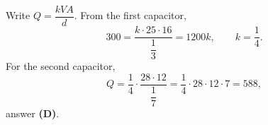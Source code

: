 Write $Q=\dfrac{kVA}{d}$. From the first capacitor,
\[
300=\dfrac{k\cdot25\cdot16}{\dfrac{1}{3}}=1200k,\qquad k=\dfrac{1}{4}.
\]
For the second capacitor,
\[
Q=\dfrac{1}{4}\cdot\dfrac{28\cdot12}{\dfrac{1}{7}}=\dfrac{1}{4}\cdot28\cdot12\cdot7=588,
\]
answer \textbf{(D)}.
